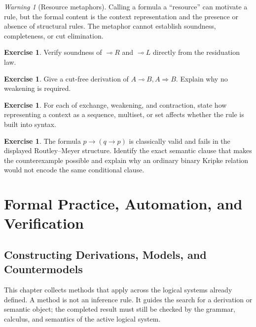 \documentclass[11pt,oneside,openany]{book}
\theoremstyle{definition}
\newtheorem{exercise}[definition]{Exercise}
\theoremstyle{plain}
\theoremstyle{remark}
\newtheorem{warning}[definition]{Warning}
\begin{document}
\begin{warning}[Resource metaphors]
Calling a formula a ``resource'' can motivate a rule, but the formal content is
the context representation and the presence or absence of structural rules.
The metaphor cannot establish soundness, completeness, or cut elimination.
\end{warning}

\begin{exercise}
\label{ex:relevance-linear-01}
Verify soundness of \(\multimap R\) and \(\multimap L\) directly from the
residuation law.
\end{exercise}

\begin{exercise}
\label{ex:relevance-linear-02}
Give a cut-free derivation of
\(A\multimap B,A\Rightarrow B\).  Explain why no weakening is required.
\end{exercise}

\begin{exercise}
\label{ex:relevance-linear-03}
For each of exchange, weakening, and contraction, state how representing a
context as a sequence, multiset, or set affects whether the rule is built into
syntax.
\end{exercise}

\begin{exercise}
\label{ex:relevance-linear-04}
The formula \(p\to(q\to p)\) is classically valid and fails in the displayed
Routley--Meyer structure.  Identify the exact semantic clause that makes the
counterexample possible and explain why an ordinary binary Kripke relation would
not encode the same conditional clause.
\end{exercise}
\part{Formal Practice, Automation, and Verification}

\chapter{Constructing Derivations, Models, and Countermodels}
\label{ch:formal-practice}

This chapter collects methods that apply across the logical systems already
defined.  A method is not an inference rule.  It guides the search for a
derivation or semantic object; the completed result must still be checked by
the grammar, calculus, and semantics of the active logical system.
\end{document}
